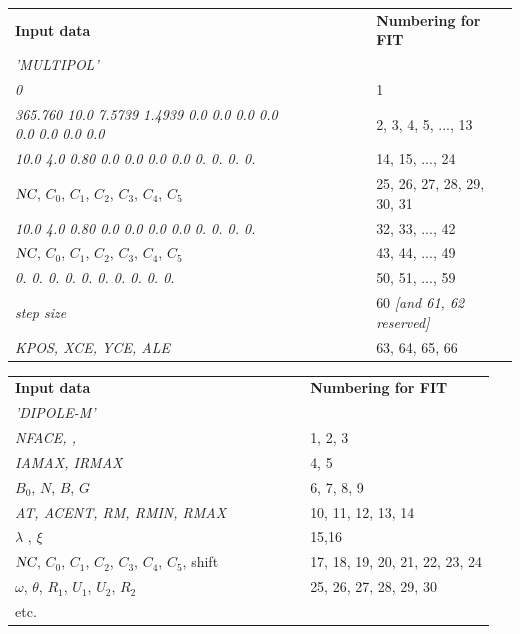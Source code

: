 \begin{center}
{\renewcommand{\arraystretch}{1}
	\begin{tabular}{lcl}
	\textbf{Input  data}  &~~~~~~~~&  \textbf{Numbering  for  FIT}\\[1ex]
      \textsl{'MULTIPOL'}                      \\
	\textsl{0 }     &  &  1 \\
	\textsl{365.760 10.0 7.5739 1.4939 0.0 0.0 0.0 0.0 0.0 0.0 0.0 0.0} &&  2, 3, 4, 5, ..., 13    \\
	\textsl{10.0  4.0  0.80 0.0 0.0 0.0 0.0 0. 0. 0. 0. }     &&  14, 15, ..., 24       \\
	$\textsl{NC}$, $C_0$, $C_1$, $C_2$, $C_3$, $C_4$, $C_5$ &&  25, 26, 27, 28, 29, 30, 31  \\
	\textsl{10.0  4.0  0.80 0.0 0.0 0.0 0.0 0. 0. 0. 0. }     &&  32, 33, ..., 42       \\
	$\textsl{NC}$, $C_0$, $C_1$, $C_2$, $C_3$, $C_4$, $C_5$ &&  43, 44, ..., 49    \\
	\textsl{0. 0. 0. 0. 0. 0. 0. 0. 0. 0.  }     &&  50, 51,  ..., 59   \\
	\textsl{ step size }     && 60 \textsl{[and 61, 62 reserved]}   \\
	\textsl{ KPOS, XCE, YCE, ALE }     && 63, 64, 65, 66    \\
	\end{tabular}   }
\end{center}

\newpage

\begin{center}
{\renewcommand{\arraystretch}{1}
	\begin{tabular}{lcl}
	\textbf{Input  data}  &~~~~~~~~&  \textbf{Numbering  for  FIT}\\
      \textsl{'DIPOLE-M'}                      \\
	\textsl{NFACE,  \IC,  \IL}     &  &  1, 2, 3 \\
	\textsl{IAMAX,  IRMAX}         &&  4, 5    \\
	$B_0$, $N$, $B$, $G$  &&  6, 7, 8, 9\\
	\textsl{AT, ACENT, RM, RMIN, RMAX} &&  10, 11, 12, 13, 14 \\
	$\lambda$ , $\xi$     &&  15,16    \\
	$\textsl{NC}$, $C_0$, $C_1$, $C_2$, $C_3$, $C_4$, $C_5$, shift
	                      &&  17, 18, 19, 20, 21, 22, 23, 24\\
	$\omega$, $\theta$, $R_1$, $U_1$, $U_2$, $R_2$ 
	                      && 25, 26, 27, 28, 29, 30 \\
	etc.                 && 
	\end{tabular}   }
\end{center}



